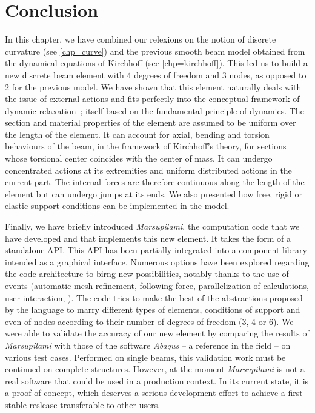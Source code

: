 \clearpage
\section{Conclusion}

In this chapter, we have combined our relexions on the notion of discrete curvature (see \cref{chp=curve}) and the previous smooth beam model obtained from the dynamical equations of Kirchhoff (see \cref{chp=kirchhoff}). This led us to build a new discrete beam element with 4 degrees of freedom and 3 nodes, as opposed to 2 for the previous model. We have shown that this element naturally deals with the issue of external actions and fits perfectly into the conceptual framework of dynamic relaxation~; itself based on the fundamental principle of dynamics. The section and material properties of the element are assumed to be uniform over the length of the element. It can account for axial, bending and torsion behaviours of the beam, in the framework of Kirchhoff's theory, for sections whose torsional center coincides with the center of mass. It can undergo concentrated actions at its extremities and uniform distributed actions in the current part. The internal forces are therefore continuous along the length of the element but can undergo jumps at its ends. We also presented how free, rigid or elastic support conditions can be implemented in the model.

Finally, we have briefly introduced \emph{Marsupilami}, the computation code that we have developed and that implements this new element. It takes the form of a standalone \Csharp{} API. This API has been partially integrated into a \grasshopper{} component library intended as a graphical interface. Numerous options have been explored regarding the code architecture to birng new possibilities, notably thanks to the use of events (automatic mesh refinement, following force, parallelization of calculations, user interaction, \telp{}). The code tries to make the best of the abstractions proposed by the language \Csharp{} to marry different types of elements, conditions of support and even of nodes according to their number of degrees of freedom (3, 4 or 6). We were able to validate the accuracy of our new element by comparing the results of \emph{Marsupilami} with those of the software \emph{Abaqus} -- a reference in the field -- on various test cases. Performed on single beams, this validation work must be continued on complete structures. However, at the moment \emph{Marsupilami} is not a real software that could be used in a production context. In its current state, it is a proof of concept, which deserves a serious development effort to achieve a first stable reslease transferable to other users.